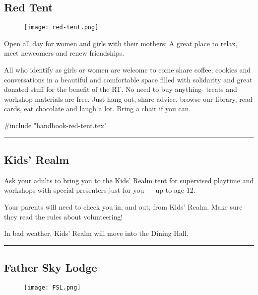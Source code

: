 \documentclass[9pt,twoside,openright,final,article,letterpaper]{memoir}
\renewcommand{\pfbreakdisplay}{%
  \needspace{24pt}%
  \vspace{8pt}\\\ding{76}\quad\ding{77}\quad\ding{78}\\%
  \vspace{11pt}}
\let\oldsubsection=\subsection
\renewcommand{\subsection}[1]{%
  \vspace{6pt}
  \needspace{1.25in}
  \oldsubsection{#1}
  \nopagebreak}
\begin{document}
\begin{multicols}{3}

  \subsection{Red Tent}

  \begingroup
  \setlength{\columnsep}{6pt}%
  \begin{wrapfigure}{l}{.5\columnwidth}
  \texttt{[image: red-tent.png]}
  \end{wrapfigure}

  Open all day for women and girls with their mothers; A great place
  to relax, meet newcomers and renew friendships.

  All who identify as girls or women are welcome to come share coffee,
  cookies and conversations in a beautiful and comfortable space
  filled with solidarity and great donated stuff for the benefit of
  the RT. No need to buy anything- treats and workshop materials are
  free. Just hang out, share advice, browse our library, read cards,
  eat chocolate and laugh a lot. Bring a chair if you can.

  \endgroup
  {\small
  #include "handbook-red-tent.tex"
   }

  \fancybreak{\pfbreakdisplay}

  \subsection{Kids' Realm}

  Ask your adults to bring you to the Kids' Realm tent for supervised
  playtime and workshops with special presenters just for you --- up to
  age 12.

  Your parents will need to check you in, and out, from Kids'
  Realm. Make sure they read the rules about volunteering!

  In bad weather, Kids’ Realm will move into the Dining Hall.

  \fancybreak{\pfbreakdisplay}


  \subsection{Father Sky Lodge}

  \begingroup
  \setlength{\columnsep}{6pt}%
  \begin{wrapfigure}{r}{.5\columnwidth}
    \texttt{[image: FSL.png]}
  \end{wrapfigure}


\end{multicols}
\end{document}
